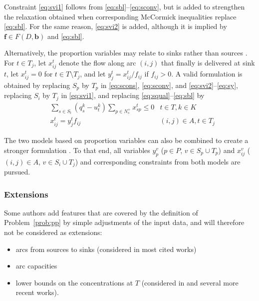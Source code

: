 \documentclass[pdflatex,sn-mathphys-num]{sn-jnl}%
\theoremstyle{thmstyleone}%
\begin{document}
Constraint \eqref{eq:svi1} follows from \eqref{eq:sbl}--\eqref{eq:sconv},
but is added to strengthen the relaxation obtained when corresponding McCormick inequalities \cite{mccormick76} replace \eqref{eq:sbl}.
For the same reason, \eqref{eq:svi2} is added, although it is implied by $\boldsymbol{f}\in F(D,\boldsymbol{b})$
and \eqref{eq:sbl}.

Alternatively, the proportion variables may relate to sinks rather than sources \cite{boland16}.
For $t\in T_j$, let $x_{ij}^t$ denote the flow along arc $(i,j)$ that finally is delivered at sink $t$,
let $x_{ij}^t=0$ for $t\in T\setminus T_j$, and let $y_j^t=x_{ij}^t/f_{ij}$ if $f_{ij}>0$.
A valid formulation is obtained by replacing $S_p$ by $T_p$ in \eqref{eq:scons}, \eqref{eq:sconv}, and \eqref{eq:svi2}--\eqref{eq:sy},
replacing $S_i$ by $T_j$ in \eqref{eq:svi1}, and replacing \eqref{eq:squal}--\eqref{eq:sbl} by
\begin{eqnarray}
     & \sum_{s\in S_t}(q_s^k-u_t^k)\sum_{p\in N_s^+}x_{sp}^t \leq 0 & t\in T, k\in K \label{eq:tqual} \\
     & x_{ij}^t = y_j^tf_{ij} & (i,j)\in A, t\in T_j \label{eq:tbl}
\end{eqnarray}

The two models based on proportion variables can also be combined to create a stronger formulation \cite{boland16}.
To that end, all variables $y_p^v$ ($p\in P$, $v\in S_p\cup T_p$) and $x_{ij}^v$ ($(i,j)\in A$, $v\in S_i\cup T_j$)
and corresponding constraints from both models are pursued.

\subsubsection{Extensions} \label{sec:ext}
Some authors add features that are covered by the definition of Problem~\ref{prob:pp} by simple adjustments of the input data,
and will therefore not be considered as extensions:
\begin{itemize}
\item arcs from sources to sinks (considered in most cited works)
\item arc capacities \cite{boland16}
\item lower bounds on the concentrations at $T$ (considered in \cite{adhya99} and several more recent works).
\end{itemize}
\end{document}
